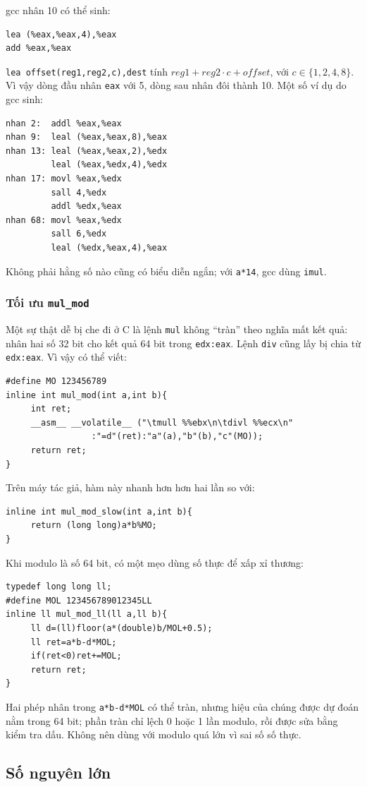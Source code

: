 \documentclass[11pt]{article}
\begin{document}
gcc nhân 10 có thể sinh:
\begin{verbatim}
lea (%eax,%eax,4),%eax
add %eax,%eax
\end{verbatim}
\texttt{lea offset(reg1,reg2,c),dest} tính \(reg1+reg2\cdot c+offset\), với
\(c\in\{1,2,4,8\}\). Vì vậy dòng đầu nhân \texttt{eax} với 5, dòng sau nhân
đôi thành 10. Một số ví dụ do gcc sinh:
\begin{verbatim}
nhan 2:  addl %eax,%eax
nhan 9:  leal (%eax,%eax,8),%eax
nhan 13: leal (%eax,%eax,2),%edx
         leal (%eax,%edx,4),%edx
nhan 17: movl %eax,%edx
         sall 4,%edx
         addl %edx,%eax
nhan 68: movl %eax,%edx
         sall 6,%edx
         leal (%edx,%eax,4),%eax
\end{verbatim}
Không phải hằng số nào cũng có biểu diễn ngắn; với \texttt{a*14}, gcc dùng
\texttt{imul}.

\subsubsection{Tối ưu \texttt{mul\_mod}}

Một sự thật dễ bị che đi ở C là lệnh \texttt{mul} không ``tràn'' theo nghĩa
mất kết quả: nhân hai số 32 bit cho kết quả 64 bit trong \texttt{edx:eax}.
Lệnh \texttt{div} cũng lấy bị chia từ \texttt{edx:eax}. Vì vậy có thể viết:
\begin{verbatim}
#define MO 123456789
inline int mul_mod(int a,int b){
     int ret;
     __asm__ __volatile__ ("\tmull %%ebx\n\tdivl %%ecx\n"
                 :"=d"(ret):"a"(a),"b"(b),"c"(MO));
     return ret;
}
\end{verbatim}
Trên máy tác giả, hàm này nhanh hơn hơn hai lần so với:
\begin{verbatim}
inline int mul_mod_slow(int a,int b){
     return (long long)a*b%MO;
}
\end{verbatim}

Khi modulo là số 64 bit, có một mẹo dùng số thực để xấp xỉ thương:
\begin{verbatim}
typedef long long ll;
#define MOL 123456789012345LL
inline ll mul_mod_ll(ll a,ll b){
     ll d=(ll)floor(a*(double)b/MOL+0.5);
     ll ret=a*b-d*MOL;
     if(ret<0)ret+=MOL;
     return ret;
}
\end{verbatim}
Hai phép nhân trong \texttt{a*b-d*MOL} có thể tràn, nhưng hiệu của chúng được
dự đoán nằm trong 64 bit; phần tràn chỉ lệch 0 hoặc 1 lần modulo, rồi được
sửa bằng kiểm tra dấu. Không nên dùng với modulo quá lớn vì sai số số thực.

\subsection{Số nguyên lớn}
\end{document}
